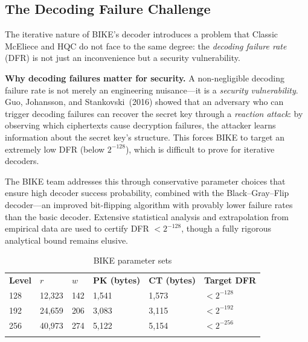 \subsection{The Decoding Failure Challenge}
\label{subsec:bike-dft}

The iterative nature of BIKE's decoder introduces a problem that Classic McEliece and HQC do not face to the same degree: the \emph{decoding failure rate} (DFR) is not just an inconvenience but a security vulnerability.

\begin{svgraybox}
\textbf{Why decoding failures matter for security.}
A non-negligible decoding failure rate is not merely an engineering nuisance---it is a \emph{security vulnerability}.  Guo, Johansson, and Stankovski~(2016) showed that an adversary who can trigger decoding failures can recover the secret key through a \emph{reaction attack}: by observing which ciphertexts cause decryption failures, the attacker learns information about the secret key's structure.  This forces BIKE to target an extremely low DFR (below $2^{-128}$), which is difficult to prove for iterative decoders.
\end{svgraybox}

The BIKE team addresses this through conservative parameter choices that ensure high decoder success probability, combined with the Black--Gray--Flip decoder---an improved bit-flipping algorithm with provably lower failure rates than the basic decoder.  Extensive statistical analysis and extrapolation from empirical data are used to certify DFR $< 2^{-128}$, though a fully rigorous analytical bound remains elusive.

\begin{table}[t]
\caption{BIKE parameter sets}
\label{tab:bike-params}
\begin{tabular}{p{2cm}p{1.8cm}p{1.5cm}p{2cm}p{2cm}p{2.5cm}}
\hline\noalign{\smallskip}
\textbf{Level} & \textbf{$r$} & \textbf{$w$} & \textbf{PK (bytes)} & \textbf{CT (bytes)} & \textbf{Target DFR} \\
\noalign{\smallskip}\svhline\noalign{\smallskip}
128 & 12,323 & 142 & 1,541 & 1,573 & $< 2^{-128}$ \\
192 & 24,659 & 206 & 3,083 & 3,115 & $< 2^{-192}$ \\
256 & 40,973 & 274 & 5,122 & 5,154 & $< 2^{-256}$ \\
\noalign{\smallskip}\hline
\end{tabular}
\end{table}

